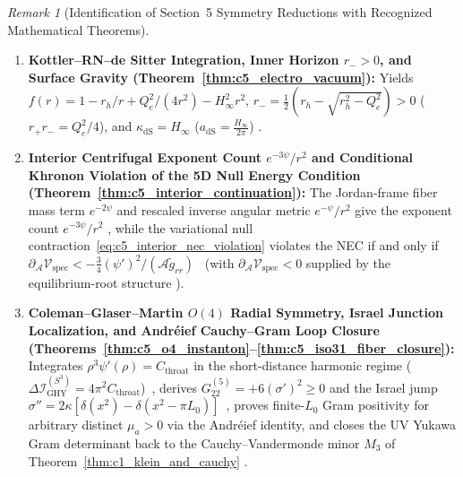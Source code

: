 \documentclass[11pt,a4paper]{article}
\newcommand{\catD}{\text{\textbf{\textcolor{blue!75!black}{[D]}}}}
\newcommand{\catH}{\text{\textbf{\textcolor{orange!80!black}{[H]}}}}
\theoremstyle{definition}
\theoremstyle{plain}
\theoremstyle{remark}
\newtheorem{remark}[axiom]{Remark}
\begin{document}
\begin{remark}[{Identification of Section~5 Symmetry Reductions with Recognized Mathematical Theorems}]
\begin{enumerate}
  \item \textbf{Kottler--RN--de Sitter Integration, Inner Horizon $r_- > 0$, and Surface Gravity (Theorem~\ref{thm:c5_electro_vacuum}):} Yields $f(r) = 1 - r_h/r + Q_e^2/(4r^2) - H_\infty^2 r^2$, $r_- = \frac{1}{2}(r_h - \sqrt{r_h^2 - Q_e^2}) > 0$ ($r_+ r_- = Q_e^2/4$), and $\kappa_{\mathrm{dS}} = H_\infty$ ($a_{\mathrm{dS}} = \frac{H_\infty}{2\pi}$) \catD.
  \item \textbf{Interior Centrifugal Exponent Count $e^{-3\psi}/r^2$ and Conditional Khronon Violation of the 5D Null Energy Condition (Theorem~\ref{thm:c5_interior_continuation}):} The Jordan-frame fiber mass term $e^{-2\psi}$ and rescaled inverse angular metric $e^{-\psi}/r^2$ give the exponent count $e^{-3\psi}/r^2$ \catD, while the variational null contraction~\eqref{eq:c5_interior_nec_violation} violates the NEC if and only if $\partial_{\mathcal{A}}\mathcal{V}_{\mathrm{spec}} < -\frac{3}{4}(\psi')^2/(\mathcal{A}\tilde{g}_{rr})$ \catD\ (with $\partial_{\mathcal{A}}\mathcal{V}_{\mathrm{spec}} < 0$ supplied by the equilibrium-root structure \catH).
  \item \textbf{Coleman--Glaser--Martin $O(4)$ Radial Symmetry, Israel Junction Localization, and Andr\'eief Cauchy--Gram Loop Closure (Theorems~\ref{thm:c5_o4_instanton}--\ref{thm:c5_iso31_fiber_closure}):} Integrates $\rho^3\psi'(\rho) = C_{\mathrm{throat}}$ in the short-distance harmonic regime ($\Delta\mathcal{I}_{\mathrm{GHY}}^{(S^3)} = 4\pi^2 C_{\mathrm{throat}}$)~\cite{Coleman1977}, derives $G_{22}^{(5)} = +6(\sigma')^2 \ge 0$ and the Israel jump $\sigma'' = 2\kappa[\delta(x^2) - \delta(x^2 - \pi L_0)]$~\cite{Israel1966}, proves finite-$L_0$ Gram positivity for arbitrary distinct $\mu_a > 0$ via the Andr\'eief identity, and closes the UV Yukawa Gram determinant back to the Cauchy--Vandermonde minor $M_3$ of Theorem~\ref{thm:c1_klein_and_cauchy} \catD.
\end{enumerate}
\end{remark}
\end{document}
